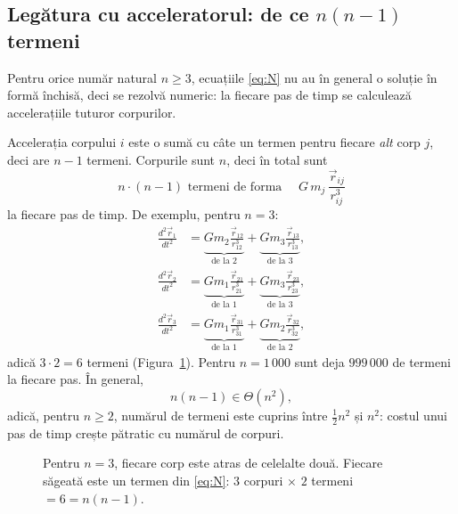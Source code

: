 \documentclass[11pt,a4paper]{article}
\newcommand{\vr}{\vec r}
\newcommand{\odd}[1]{\frac{d^{2} #1}{d t^{2}}}
\begin{document}
\subsection*{Legătura cu acceleratorul: de ce $n(n-1)$ termeni}
Pentru orice număr natural $n \ge 3$, ecuațiile \eqref{eq:N} nu au în general o soluție în formă închisă, deci se rezolvă numeric: la fiecare pas de timp se calculează accelerațiile tuturor corpurilor.

Accelerația corpului $i$ este o sumă cu câte un termen pentru fiecare \emph{alt} corp $j$, deci are $n - 1$ termeni. Corpurile sunt $n$, deci în total sunt
\[
  n \cdot (n-1) \text{ termeni de forma } \quad G\,m_j\,\frac{\vr_{ij}}{r_{ij}^{3}}
\]
la fiecare pas de timp. De exemplu, pentru $n = 3$:
\begin{align*}
  \odd{\vr_1} &= \underbrace{G m_2 \tfrac{\vr_{12}}{r_{12}^3}}_{\text{de la 2}} + \underbrace{G m_3 \tfrac{\vr_{13}}{r_{13}^3}}_{\text{de la 3}},\\
  \odd{\vr_2} &= \underbrace{G m_1 \tfrac{\vr_{21}}{r_{21}^3}}_{\text{de la 1}} + \underbrace{G m_3 \tfrac{\vr_{23}}{r_{23}^3}}_{\text{de la 3}},\\
  \odd{\vr_3} &= \underbrace{G m_1 \tfrac{\vr_{31}}{r_{31}^3}}_{\text{de la 1}} + \underbrace{G m_2 \tfrac{\vr_{32}}{r_{32}^3}}_{\text{de la 2}},
\end{align*}
adică $3 \cdot 2 = 6$ termeni (Figura~\ref{fig:termeni}). Pentru $n = 1\,000$ sunt deja $999\,000$ de termeni la fiecare pas. În general,
\[
  n(n-1) \in \Theta(n^2),
\]
adică, pentru $n \ge 2$, numărul de termeni este cuprins între $\tfrac{1}{2}n^2$ și $n^2$: costul unui pas de timp crește pătratic cu numărul de corpuri.

\begin{figure}[H]
\centering
{}
\caption{Pentru $n = 3$, fiecare corp este atras de celelalte două. Fiecare săgeată este un termen din \eqref{eq:N}: $3$ corpuri $\times$ $2$ termeni $= 6 = n(n-1)$.}
\label{fig:termeni}
\end{figure}
\end{document}
